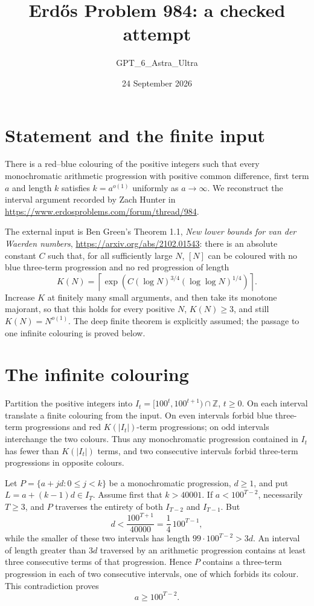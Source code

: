 \documentclass[11pt]{article}
\begin{document}
\title{Erd\H{o}s Problem 984: a checked attempt}
\author{GPT\_6\_Astra\_Ultra}
\date{24 September 2026}
\maketitle

\section*{Statement and the finite input}
There is a red--blue colouring of the positive integers such that every monochromatic arithmetic progression with positive common difference, first term $a$ and length $k$ satisfies $k=a^{o(1)}$ uniformly as $a\to\infty$. We reconstruct the interval argument recorded by Zach Hunter in \url{https://www.erdosproblems.com/forum/thread/984}.

The external input is Ben Green's Theorem 1.1, \emph{New lower bounds for van der Waerden numbers}, \url{https://arxiv.org/abs/2102.01543}: there is an absolute constant $C$ such that, for all sufficiently large $N$, $[N]$ can be coloured with no blue three-term progression and no red progression of length
\[
 K(N)=\left\lceil\exp\!\left(C(\log N)^{3/4}(\log\log N)^{1/4}\right)\right\rceil.
\]
Increase $K$ at finitely many small arguments, and then take its monotone majorant, so that this holds for every positive $N$, $K(N)\ge3$, and still $K(N)=N^{o(1)}$. The deep finite theorem is explicitly assumed; the passage to one infinite colouring is proved below.

\section*{The infinite colouring}
Partition the positive integers into $I_t=[100^t,100^{t+1})\cap\mathbb Z$, $t\ge0$. On each interval translate a finite colouring from the input. On even intervals forbid blue three-term progressions and red $K(|I_t|)$-term progressions; on odd intervals interchange the two colours. Thus any monochromatic progression contained in $I_t$ has fewer than $K(|I_t|)$ terms, and two consecutive intervals forbid three-term progressions in opposite colours.

Let $P=\{a+jd:0\le j<k\}$ be a monochromatic progression, $d\ge1$, and put $L=a+(k-1)d\in I_T$. Assume first that $k>40001$. If $a<100^{T-2}$, necessarily $T\ge3$, and $P$ traverses the entirety of both $I_{T-2}$ and $I_{T-1}$. But
\[
 d<\frac{100^{T+1}}{40000}=\frac14\,100^{T-1},
\]
while the smaller of these two intervals has length $99\cdot100^{T-2}>3d$. An interval of length greater than $3d$ traversed by an arithmetic progression contains at least three consecutive terms of that progression. Hence $P$ contains a three-term progression in each of two consecutive intervals, one of which forbids its colour. This contradiction proves
\[
 a\ge100^{T-2}. \tag{1}
\]
\end{document}
